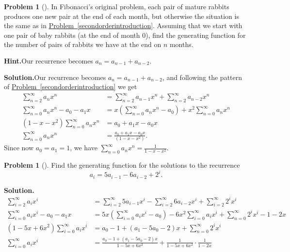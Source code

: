 \documentclass[10pt,]{book}
\theoremstyle{plain}
\theoremstyle{definition}
\newtheorem{activity}[project]{Problem}
\theoremstyle{definition}
\numberwithin{equation}{chapter}
\newcommand{\amp}{&}
\begin{document}
\begin{activity}[]\label{originalFibonacci}
In Fibonacci's original problem, each pair of mature rabbits produces one new pair at the end of each month, but otherwise the situation is the same as in \hyperref[secondorderintroduction]{Problem~\ref{secondorderintroduction}}.  Assuming that we start with one pair of baby rabbits (at the end of month 0), find the generating function for the number of pairs of rabbits we have at the end on \(n\) months.%
\par\medskip\noindent%
\textbf{Hint.}\quad Our recurrence becomes \(a_n = a_{n-1} + a_{n-2}\).%
\par\medskip\noindent%
\textbf{Solution.}\quad Our recurrence becomes \(a_n=a_{n-1}+a_{n-2}\), and following the pattern of \hyperref[secondorderintroduction]{Problem~\ref{secondorderintroduction}} we get%
\begin{align*}
\sum_{n=2}^\infty a_nx^n \amp= \sum_{n=2}^\infty a_{n-1}x^n +
\sum_{n=2}^\infty a_{n-2}x^n\\
\sum_{n=0}^\infty a_nx^n-a_0-a_1x  \amp= x\left(\sum_{n=0}^\infty
a_{n}x^{n}-a_0\right) + x^2\sum_{n=0}^\infty a_{n}x^n\\
(1-x-x^2)\sum_{n=0}^\infty a_nx^n \amp= a_0+a_1x-a_0x\\
\sum_{n=0}^\infty a_nx^n \amp= \frac{a_0+a_1x-a_0x}{(1-x-x^2)}\text{.}
\end{align*}
Since now \(a_0=a_1=1\), we have \(\displaystyle \sum_{n=0}^\infty a_nx^n=
\frac{1}{1-x-x^2}\).%
\end{activity}
\begin{activity}[]\label{secondordernonhomo}
Find the generating function for the solutions to the recurrence%
\begin{equation*}
a_i=5a_{i-1}-6a_{i-2} + 2^i.
\end{equation*}
%
\par\medskip\noindent%
\textbf{Solution.}\quad %
\begin{align*}
\sum_{i=2}^\infty a_ix^i  \amp=  \sum_{i=2}^\infty
5a_{i-1}x^i-\sum_{i=2}^\infty 6a_{i-2}x^i + \sum_{i=2}^\infty 2^ix^i\\
\sum_{i=0}^\infty a_ix^i -a_0-a_1x  \amp=
5x\left(\sum_{i=0}^\infty
a_{i}x^i-a_0\right)-6x^2\sum_{i=0}^\infty a_{i}x^i + \sum_{n=0}^\infty
2^ix^i-1-2x\\
(1-5x+6x^2)\sum_{i=0}^\infty a_ix^i \amp= a_0-1+(a_1-5a_0-2)x +
\sum_{n=0}^\infty 2^ix^i\\
\sum_{i=0}^\infty a_ix^i \amp=  \frac{a_0-1+(a_1-5a_0-2)x}{1-5x+6x^2}+ \frac{1}{1-5x+6x^2}\cdot\frac{1}{1-2x}
\end{align*}
%
\end{activity}
\end{document}
